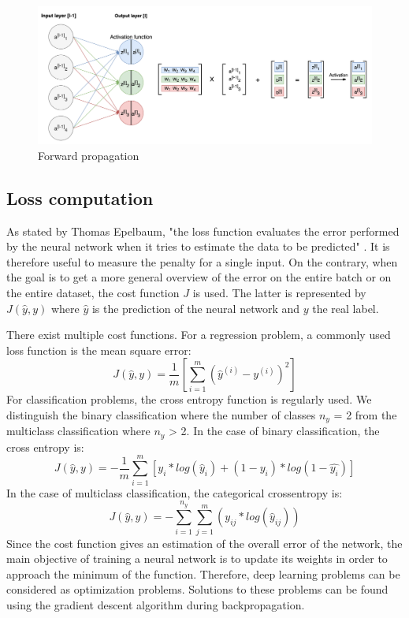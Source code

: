 \begin{figure}[!h]
\centering
\includegraphics[width=1\textwidth, keepaspectratio=true]{./figures/forward_propagation.png}
\caption{Forward propagation }
\label{forward_propagation}
\end{figure}

\subsection{Loss computation}

\setlength{\marginparwidth}{3cm}\leavevmode {}As stated by Thomas Epelbaum, "the loss function evaluates the error performed by the neural network when it tries to estimate the data to be predicted" \cite{18}. It is therefore useful to measure the penalty for a single input. On the contrary, when the goal is to get a more general overview of the error on the entire batch or on the entire dataset, the cost function $J$ is used. The latter is represented by $J(\hat{y}, y)$ where $\hat{y}$ is the prediction of the neural network and $y$ the real label. 

There exist multiple cost functions. For a regression problem, a commonly used loss function is the mean square error:
\begin{equation}
J(\hat{y}, y) = \frac{1}{m}[\sum_{i=1}^{m} (\hat{y}^{(i)} - y^{(i)})^{2}]
\end{equation}
For classification problems, the cross entropy function is regularly used. We distinguish the binary classification where the number of classes $n_{y}$ = 2 from the multiclass classification where $n_{y}$ > 2. In the case of binary classification, the cross entropy is:
\begin{equation}
J(\hat{y}, y) = -\frac{1}{m}\sum_{i=1}^{m} [y_{i}*log(\hat{y}_{i}) + (1-y_{i})*log(1-\hat{y_i})]
\end{equation}
In the case of multiclass classification, the categorical crossentropy is:
\begin{equation}
J(\hat{y}, y) = - \sum_{i=1}^{n_{y}} \sum_{j=1}^{m} (y_{ij}*log(\hat{y}_{ij}))
\end{equation}
Since the cost function gives an estimation of the overall error of the network, the main objective of training a neural network is to update its weights in order to approach the minimum of the function. Therefore, deep learning problems can be considered as optimization problems. Solutions to these problems can be found using the gradient descent algorithm during backpropagation.

